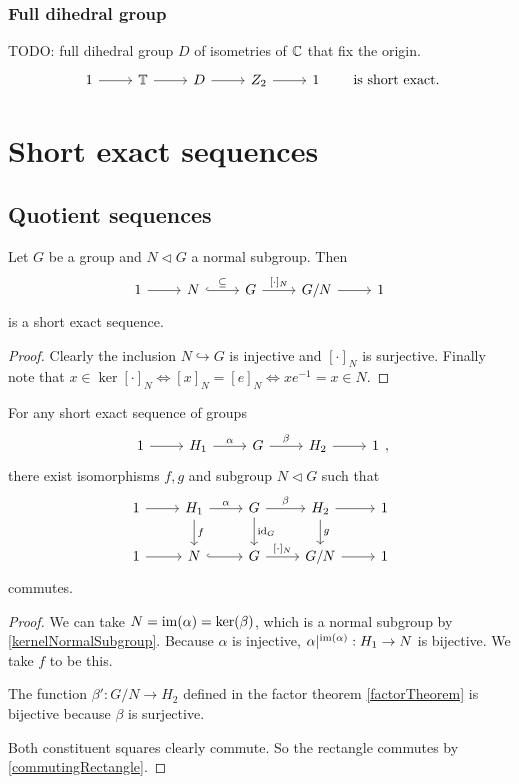 \subsubsection{Full dihedral group}
TODO: full dihedral group $D$ of isometries of $\mathbb{C}$ that fix the origin.
\[ \begin{tikzcd}
1 \rar & \T \rar & D\rar & Z_2 \rar & 1
\end{tikzcd} \qquad\text{is short exact.} \]

\section{Short exact sequences}
\subsection{Quotient sequences}
\begin{proposition}
Let $G$ be a group and $N\lhd G$ a normal subgroup. Then
\[ \begin{tikzcd}
1 \rar & N \rar[hookrightarrow]{\subseteq} & G \rar{[\cdot]_N} & G/N \rar & 1
\end{tikzcd} \]
is a short exact sequence.
\end{proposition}
\begin{proof}
Clearly the inclusion $N\hookrightarrow G$ is injective and $[\cdot]_N$ is surjective. Finally note that $x\in \ker[\cdot]_N \iff [x]_N = [e]_N \iff xe^{-1} = x\in N$.
\end{proof}

\begin{proposition}
For any short exact sequence of groups
\[ \begin{tikzcd}
1 \rar & H_1 \rar{\alpha} & G \rar{\beta} & H_2 \rar & 1
\end{tikzcd}, \]
there exist isomorphisms $f,g$ and subgroup $N\lhd G$ such that
\[ \begin{tikzcd}
1 \rar & H_1 \dar{f} \rar{\alpha} & G \dar{\id_G} \rar{\beta} & H_2 \dar{g} \rar & 1 \\
1 \rar & N \rar[hookrightarrow] & G \rar{[\cdot]_N} & G/N \rar & 1
\end{tikzcd} \]
commutes.
\end{proposition}
\begin{proof}
We can take $N = \operatorname{im}(\alpha) = \ker(\beta)$, which is a normal subgroup by \ref{kernelNormalSubgroup}. Because $\alpha$ is injective, $\alpha|^{\operatorname{im}(\alpha)}: H_1 \to N$ is bijective. We take $f$ to be this.

The function $\beta': G/N \to H_2$ defined in the factor theorem \ref{factorTheorem} is bijective because $\beta$ is surjective.

Both constituent squares clearly commute. So the rectangle commutes by \ref{commutingRectangle}.
\end{proof}

